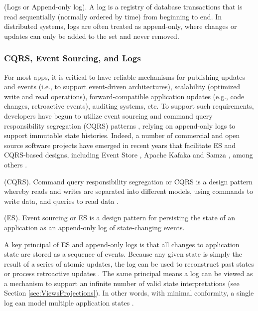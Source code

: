 \documentclass{textile}
\begin{document}
\begin{definition} (Logs or Append-only log). A log is a registry of database transactions that is read sequentially (normally ordered by time) from beginning to end. In distributed systems, logs are often treated as append-only, where changes or updates can only be added to the set and never removed.  \end{definition} \label{def:Logs}

\subsubsection{CQRS, Event Sourcing, and Logs}\label{sec:cqrs}

For most apps, it is critical to have reliable mechanisms for publishing updates and events (i.e., to support event-driven architectures), scalability (optimized write and read operations), forward-compatible application updates (e.g., code changes, retroactive events), auditing systems, etc. To support such requirements, developers have begun to utilize event sourcing and command query responsibility segregation (CQRS) patterns \cite{bettsExploringCQRSEvent2013}, relying on append-only logs to support immutable state histories. Indeed, a number of commercial and open source software projects have emerged in recent years that facilitate ES and CQRS-based designs, including Event Store \cite{EventStore}, Apache Kafaka \cite{ApacheKafka} and Samza \cite{ApacheSamza}, among others \cite{kleppmannDesigningDataintensiveApplications2017}. 

\begin{definition}
  (CQRS). Command query responsibility segregation or CQRS is a design pattern whereby reads and writes are separated into different models, using commands to write data, and queries to read data \cite{martinfowlerCQRS2011}.
\end{definition}

\begin{definition}
  (ES). Event sourcing or ES is a design pattern for persisting the state of an application as an append-only log of state-changing events.
\end{definition}

A key principal of ES and append-only logs is that all changes to application state are stored as a sequence of events. Because any given state is simply the result of a series of atomic updates, the log can be used to reconstruct past states or process retroactive updates \cite{fowlerEventSourcing}. The same principal means a log can be viewed as a mechanism to support an infinite number of valid state interpretations (see Section  \ref{sec:ViewsProjections}). In other words, with minimal conformity, a single log can model multiple application states \cite{microsoftcorporationAzureApplicationArchitecture}.
\end{document}
